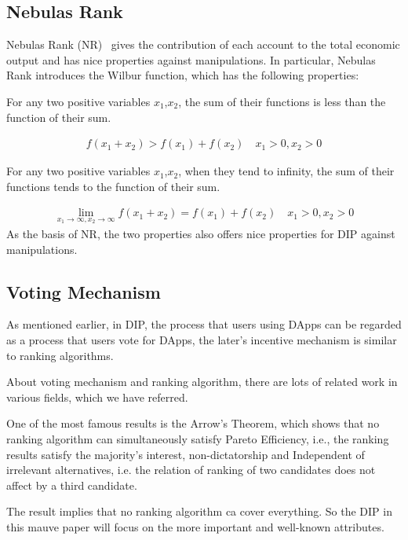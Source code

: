 \subsection{Nebulas Rank}
Nebulas Rank (NR)~\cite{Nebulasyellowpaper} gives the contribution of each account to the total economic output and has nice properties against manipulations. In particular, Nebulas Rank introduces the Wilbur function, which has the following properties: 

\begin{property}
	\label{prop:one}
	For any two positive variables $x_1$,$x_2$, the sum of their functions is less than the function of their sum. 
\end{property}
\begin{align}
	f(x_1+x_2)>f(x_1)+f(x_2) \quad x_1>0,x_2>0
\end{align}
\begin{property}
	\label{prop:two}
	For any two positive variables $x_1$,$x_2$, when they tend to infinity, the sum of their functions tends to the function of their sum. 
\end{property}

\begin{align}
	\lim\limits_{x_1 \to \infty, x_2\to \infty} f(x_1+x_2) = f(x_1) + f(x_2)\quad x_1>0, x_2>0
\end{align}
\noindent As the basis of NR, the two properties also offers nice properties for DIP against manipulations. 

\subsection{Voting Mechanism}
As mentioned earlier, in DIP, the process that users using DApps can be regarded as a process that users vote for DApps, the later's incentive mechanism is similar to ranking algorithms. 

About voting mechanism and ranking algorithm, there are lots of related work in various fields, which we have referred. 

One of the most famous results is the Arrow's Theorem, which shows that no ranking algorithm can simultaneously satisfy Pareto Efficiency, i.e., the ranking results satisfy the majority's interest, non-dictatorship and Independent of irrelevant alternatives, i.e. the relation of ranking of two candidates does not affect by a third candidate. 

The result implies that no ranking algorithm ca cover everything. So the DIP in this mauve paper will focus on the more important and well-known attributes. 

